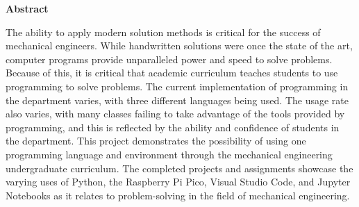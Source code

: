 \begin{flushleft}
    \Large
    \textbf{Abstract}
    \normalsize
    \thispagestyle{empty}
\end{flushleft}

The ability to apply modern solution methods is critical for the success
of mechanical engineers. While handwritten solutions were once the 
state of the art, computer programs provide unparalleled power and speed 
to solve problems. Because of this, it is critical that academic 
curriculum teaches students to use programming to solve problems.
The current implementation of programming in the department varies,
with three different languages being used. The usage rate also varies,
with many classes failing to take advantage of the tools provided by
programming, and this is reflected by the ability and confidence of
students in the department.
This project demonstrates the possibility of using one programming 
language and environment through the mechanical engineering
undergraduate curriculum. The completed projects and assignments
showcase the varying uses of Python, the Raspberry Pi Pico, Visual
Studio Code, and Jupyter Notebooks as it relates to problem-solving
in the field of mechanical engineering.
